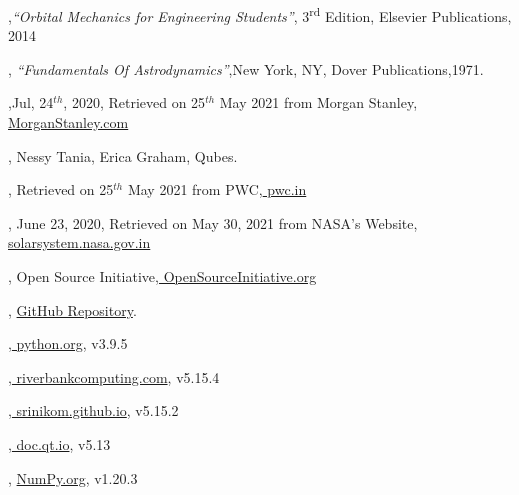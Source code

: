 \documentclass[12pt]{article}
\begin{document}
\begin{thebibliography}{99}
	,{\textit{\enquote{Orbital Mechanics for Engineering Students}}},{ 3\textsuperscript{rd} Edition}, { Elsevier Publications},{ 2014}	
	
	,{ \textit{\enquote{Fundamentals Of Astrodynamics}}},{New York, NY},{ Dover Publications},{1971}.
	
	,{Jul, 24$^{th}$, 2020}, { Retrieved on 25$^{th}$ May 2021 from Morgan Stanley},{\href{https://www.morganstanley.com/ideas/investing-in-space}{ MorganStanley.com}}
	
	,{ Nessy Tania, Erica Graham}, {Qubes.}
	
	,{ Retrieved on 25$^{th}$ May 2021 from PWC},{\href{https://www.pwc.in/research-insights/2020/preparing-to-scale-new-heights.html}{ pwc.in}}
	
	, { June 23, 2020}, { Retrieved on May 30, 2021 from NASA's Website}, {\href{https://solarsystem.nasa.gov/resources/754/what-is-a-lagrange-point/}{solarsystem.nasa.gov.in}}
	
	,{ Open Source Initiative},{\href{https://opensource.org/licenses/gpl-3.0.html}{ OpenSourceInitiative.org}}

	, {\href{https://github.com/iamlrk/MOPy}{GitHub Repository}}.
	
	,{\href{https://docs.python.org}{ python.org}},{ v3.9.5}
	
	,{\href{https://www.riverbankcomputing.com/static/Docs/PyQt5/}{ riverbankcomputing.com}},{ v5.15.4}
	
	,{\href{https://srinikom.github.io/pyside-docs/pysideapi2.html}{ srinikom.github.io}},{ v5.15.2}
	
	,{\href{https://doc.qt.io/qt-5/qtdesigner-manual.html}{ doc.qt.io}},{ v5.13}
	
	, {\href{https://numpy.org/doc}{ NumPy.org}},{ v1.20.3}
	

\end{thebibliography}
\end{document}
